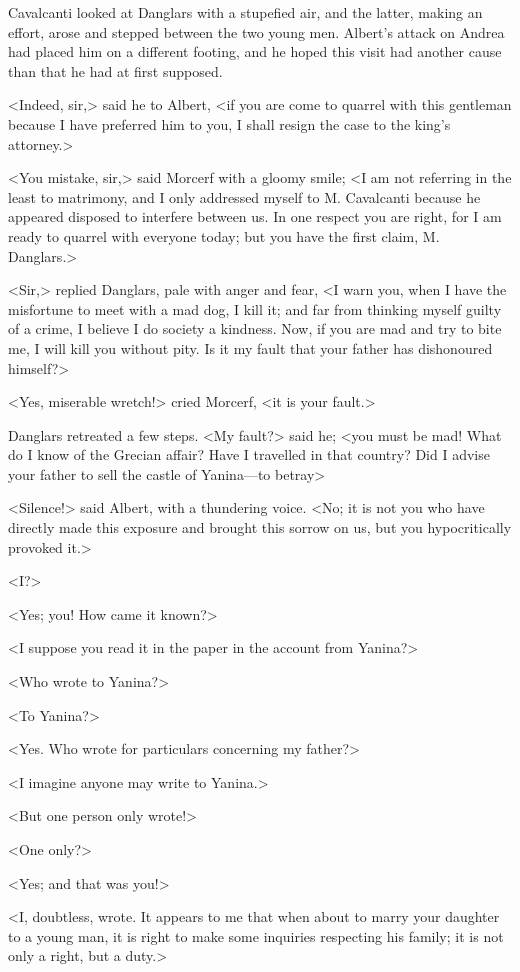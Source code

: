  Cavalcanti looked at Danglars with a stupefied air, and the latter, making an effort, arose and stepped between the two young men. Albert's attack on Andrea had placed him on a different footing, and he hoped this visit had another cause than that he had at first supposed. 

 <Indeed, sir,> said he to Albert, <if you are come to quarrel with this gentleman because I have preferred him to you, I shall resign the case to the king's attorney.> 

 <You mistake, sir,> said Morcerf with a gloomy smile; <I am not referring in the least to matrimony, and I only addressed myself to M. Cavalcanti because he appeared disposed to interfere between us. In one respect you are right, for I am ready to quarrel with everyone today; but you have the first claim, M. Danglars.>  
 
 <Sir,> replied Danglars, pale with anger and fear, <I warn you, when I have the misfortune to meet with a mad dog, I kill it; and far from thinking myself guilty of a crime, I believe I do society a kindness. Now, if you are mad and try to bite me, I will kill you without pity. Is it my fault that your father has dishonoured himself?> 

 <Yes, miserable wretch!> cried Morcerf, <it is your fault.> 

 Danglars retreated a few steps. <My fault?> said he; <you must be mad! What do I know of the Grecian affair? Have I travelled in that country? Did I advise your father to sell the castle of Yanina—to betray\longdash> 

 <Silence!> said Albert, with a thundering voice. <No; it is not you who have directly made this exposure and brought this sorrow on us, but you hypocritically provoked it.> 

 <I?> 

 <Yes; you! How came it known?> 

 <I suppose you read it in the paper in the account from Yanina?> 

 <Who wrote to Yanina?> 

 <To Yanina?> 

 <Yes. Who wrote for particulars concerning my father?> 

 <I imagine anyone may write to Yanina.> 

 <But one person only wrote!> 

 <One only?> 

 <Yes; and that was you!> 

 <I, doubtless, wrote. It appears to me that when about to marry your daughter to a young man, it is right to make some inquiries respecting his family; it is not only a right, but a duty.> 

